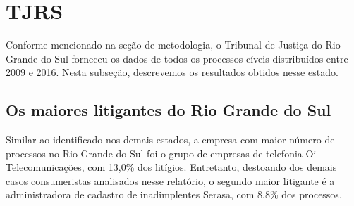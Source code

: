 \documentclass[]{report}
\begin{document}
\section{TJRS}\label{tjrs}

Conforme mencionado na seção de metodologia, o Tribunal de Justiça do
Rio Grande do Sul forneceu os dados de todos os processos cíveis
distribuídos entre 2009 e 2016. Nesta subseção, descrevemos os
resultados obtidos nesse estado.

\subsection{Os maiores litigantes do Rio Grande do
Sul}\label{os-maiores-litigantes-do-rio-grande-do-sul}

Similar ao identificado nos demais estados, a empresa com maior número
de processos no Rio Grande do Sul foi o grupo de empresas de telefonia
Oi Telecomunicações, com 13,0\% dos litígios. Entretanto, destoando dos
demais casos consumeristas analisados nesse relatório, o segundo maior
litigante é a administradora de cadastro de inadimplentes Serasa, com
8,8\% dos processos.
\end{document}
